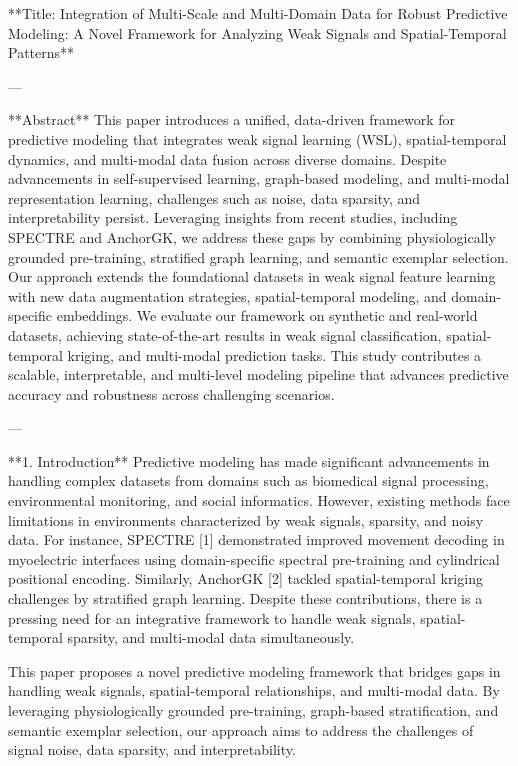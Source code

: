 **Title: Integration of Multi-Scale and Multi-Domain Data for Robust Predictive Modeling: A Novel Framework for Analyzing Weak Signals and Spatial-Temporal Patterns**

---

**Abstract**  
This paper introduces a unified, data-driven framework for predictive modeling that integrates weak signal learning (WSL), spatial-temporal dynamics, and multi-modal data fusion across diverse domains. Despite advancements in self-supervised learning, graph-based modeling, and multi-modal representation learning, challenges such as noise, data sparsity, and interpretability persist. Leveraging insights from recent studies, including SPECTRE and AnchorGK, we address these gaps by combining physiologically grounded pre-training, stratified graph learning, and semantic exemplar selection. Our approach extends the foundational datasets in weak signal feature learning with new data augmentation strategies, spatial-temporal modeling, and domain-specific embeddings. We evaluate our framework on synthetic and real-world datasets, achieving state-of-the-art results in weak signal classification, spatial-temporal kriging, and multi-modal prediction tasks. This study contributes a scalable, interpretable, and multi-level modeling pipeline that advances predictive accuracy and robustness across challenging scenarios.

---

**1. Introduction**  
Predictive modeling has made significant advancements in handling complex datasets from domains such as biomedical signal processing, environmental monitoring, and social informatics. However, existing methods face limitations in environments characterized by weak signals, sparsity, and noisy data. For instance, SPECTRE [1] demonstrated improved movement decoding in myoelectric interfaces using domain-specific spectral pre-training and cylindrical positional encoding. Similarly, AnchorGK [2] tackled spatial-temporal kriging challenges by stratified graph learning. Despite these contributions, there is a pressing need for an integrative framework to handle weak signals, spatial-temporal sparsity, and multi-modal data simultaneously.  

This paper proposes a novel predictive modeling framework that bridges gaps in handling weak signals, spatial-temporal relationships, and multi-modal data. By leveraging physiologically grounded pre-training, graph-based stratification, and semantic exemplar selection, our approach aims to address the challenges of signal noise, data sparsity, and interpretability.

